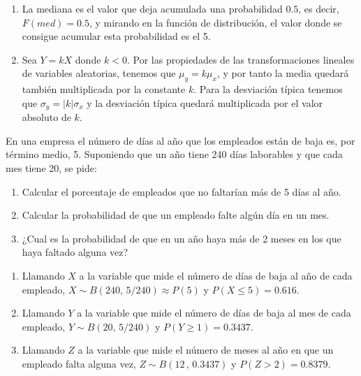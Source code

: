 {\begin{enumerate}
\item La mediana es el valor que deja acumulada una probabilidad $0.5$, es decir, $F(med)=0.5$, y mirando en la función de distribución, el
valor donde se consigue acumular esta probabilidad es el 5.

\item Sea $Y=kX$ donde $k<0$. Por las propiedades de las transformaciones lineales de variables aleatorias, tenemos que $\mu_y=k\mu_x$, y
por tanto la media quedará también multiplicada por la constante $k$. Para la desviación típica tenemos que $\sigma_y=|k|\sigma_x$ y la
desviación típica quedará multiplicada por el valor absoluto de $k$.
\end{enumerate}
}


{En una empresa el número de días al año que los empleados están de baja es, por término medio, 5. Suponiendo que un año tiene 240 días
laborables y que cada mes tiene 20, se pide:
\begin{enumerate}
\item Calcular el porcentaje de empleados que no faltarían más de 5 días al año.
\item Calcular la probabilidad de que un empleado falte algún día en un mes.
\item ¿Cual es la probabilidad de que en un año haya más de 2 meses en los que haya faltado alguna vez?
\end{enumerate}
} 
{
\begin{enumerate}
\item Llamando $X$ a la variable que mide el número de días de baja al año de cada empleado, $X\sim B(240,\,5/240)\approx P(5)$ y
$P(X\leq 5)=0.616$.
\item Llamando $Y$ a la variable que mide el número de días de baja al mes de cada empleado, $Y\sim B(20,\,5/240)$ y $P(Y\geq 1)=0.3437$.
\item Llamando $Z$ a la variable que mide el número de meses al año en que un empleado falta alguna vez, $Z\sim B(12\,,\,0.3437)$ y
$P(Z>2)=0.8379$.
\end{enumerate}
}
